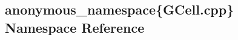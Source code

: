 \hypertarget{namespaceanonymous__namespace_02GCell_8cpp_03}{\subsection{anonymous\-\_\-namespace\{G\-Cell.\-cpp\} Namespace Reference}
\label{namespaceanonymous__namespace_02GCell_8cpp_03}
}
